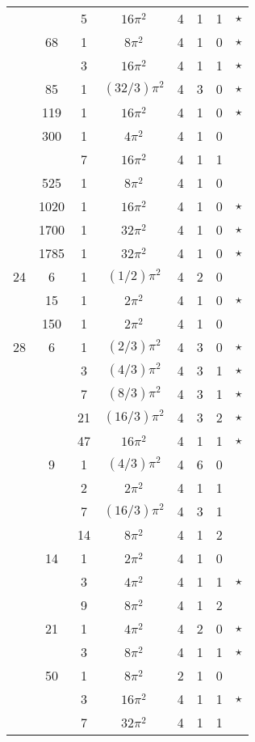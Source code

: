 \documentclass[12pt]{amsart}
\begin{document}
\begin{tabular}{ccc|ccccc}
 &  & 5 & $16\pi^2$ & 4 & 1 & 1 & $\star$ \\
 & 68 & 1 & $8\pi^2$ & 4 & 1 & 0 & $\star$ \\
 &  & 3 & $16\pi^2$ & 4 & 1 & 1 & $\star$ \\
 & 85 & 1 & $(32/3)\pi^2$ & 4 & 3 & 0 & $\star$ \\
 & 119 & 1 & $16\pi^2$ & 4 & 1 & 0 & $\star$ \\
 & 300 & 1 & $4\pi^2$ & 4 & 1 & 0 &  \\
 &  & 7 & $16\pi^2$ & 4 & 1 & 1 &  \\
 & 525 & 1 & $8\pi^2$ & 4 & 1 & 0 &  \\
 & 1020 & 1 & $16\pi^2$ & 4 & 1 & 0 & $\star$ \\
 & 1700 & 1 & $32\pi^2$ & 4 & 1 & 0 & $\star$ \\
 & 1785 & 1 & $32\pi^2$ & 4 & 1 & 0 & $\star$ \\
24 & 6 & 1 & $(1/2)\pi^2$ & 4 & 2 & 0 &  \\
 & 15 & 1 & $2\pi^2$ & 4 & 1 & 0 & $\star$ \\
 & 150 & 1 & $2\pi^2$ & 4 & 1 & 0 &  \\
28 & 6 & 1 & $(2/3)\pi^2$ & 4 & 3 & 0 & $\star$ \\
 &  & 3 & $(4/3)\pi^2$ & 4 & 3 & 1 & $\star$ \\
 &  & 7 & $(8/3)\pi^2$ & 4 & 3 & 1 & $\star$ \\
 &  & 21 & $(16/3)\pi^2$ & 4 & 3 & 2 & $\star$ \\
 &  & 47 & $16\pi^2$ & 4 & 1 & 1 & $\star$ \\
 & 9 & 1 & $(4/3)\pi^2$ & 4 & 6 & 0 &  \\
 &  & 2 & $2\pi^2$ & 4 & 1 & 1 &  \\
 &  & 7 & $(16/3)\pi^2$ & 4 & 3 & 1 &  \\
 &  & 14 & $8\pi^2$ & 4 & 1 & 2 &  \\
 & 14 & 1 & $2\pi^2$ & 4 & 1 & 0 &  \\
 &  & 3 & $4\pi^2$ & 4 & 1 & 1 & $\star$ \\
 &  & 9 & $8\pi^2$ & 4 & 1 & 2 &  \\
 & 21 & 1 & $4\pi^2$ & 4 & 2 & 0 & $\star$ \\
 &  & 3 & $8\pi^2$ & 4 & 1 & 1 & $\star$ \\
 & 50 & 1 & $8\pi^2$ & 2 & 1 & 0 &  \\
 &  & 3 & $16\pi^2$ & 4 & 1 & 1 & $\star$ \\
 &  & 7 & $32\pi^2$ & 4 & 1 & 1 &  \\

\end{tabular}
\end{document}

